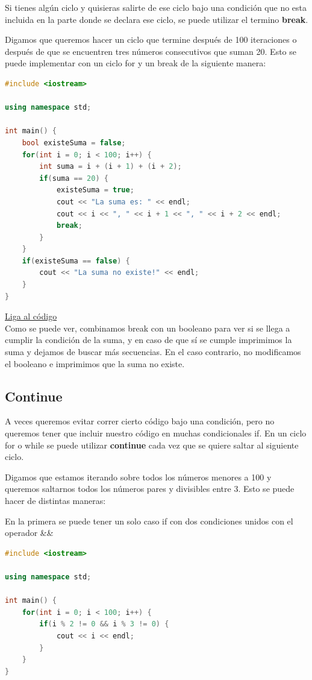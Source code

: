 \documentclass{article}
\begin{document}
Si tienes algún ciclo y quisieras salirte de ese ciclo bajo una condición que no esta incluida en la parte donde se declara ese ciclo, se puede utilizar el termino \textbf{break}.

Digamos que queremos hacer un ciclo que termine después de 100 iteraciones o después de que se encuentren tres números consecutivos que suman 20. Esto se puede implementar con un ciclo for y un break de la siguiente manera:

\begin{lstlisting}[language=C++, title=Break]
#include <iostream>

using namespace std;

int main() {
	bool existeSuma = false;
	for(int i = 0; i < 100; i++) {
		int suma = i + (i + 1) + (i + 2);
		if(suma == 20) {
			existeSuma = true;
			cout << "La suma es: " << endl;
			cout << i << ", " << i + 1 << ", " << i + 2 << endl;
			break;
		}
	}
	if(existeSuma == false) {
		cout << "La suma no existe!" << endl;
	}
}
\end{lstlisting}
\href{https://repl.it/@Jamesscn/Suma-Triple}{Liga al código}\\

Como se puede ver, combinamos break con un booleano para ver si se llega a cumplir la condición de la suma, y en caso de que sí se cumple imprimimos la suma y dejamos de buscar más secuencias. En el caso contrario, no modificamos el booleano e imprimimos que la suma no existe.

\subsection{Continue}

A veces queremos evitar correr cierto código bajo una condición, pero no queremos tener que incluir nuestro código en muchas condicionales if. En un ciclo for o while se puede utilizar \textbf{continue} cada vez que se quiere saltar al siguiente ciclo.

Digamos que estamos iterando sobre todos los números menores a 100 y queremos saltarnos todos los números pares y divisibles entre 3. Esto se puede hacer de distintas maneras:

En la primera se puede tener un solo caso if con dos condiciones unidos con el operador \&\&

\begin{lstlisting}[language=C++, title=Condiciones con and]
#include <iostream>

using namespace std;

int main() {
	for(int i = 0; i < 100; i++) {
		if(i % 2 != 0 && i % 3 != 0) {
			cout << i << endl;
		}
	}
}
\end{lstlisting}
\end{document}
